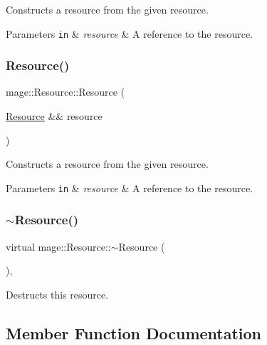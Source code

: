 Constructs a resource from the given resource.


\begin{DoxyParams}[1]{Parameters}
\mbox{\tt in}  & {\em resource} & A reference to the resource. \\
\hline
\end{DoxyParams}
\hypertarget{classmage_1_1_resource_a48b6219dc7c2366d097dd462fb5448b4}{}\label{classmage_1_1_resource_a48b6219dc7c2366d097dd462fb5448b4} 
\subsubsection{\texorpdfstring{Resource()}{Resource()}\hspace{0.1cm}{\footnotesize\ttfamily [3/3]}}
{\footnotesize\ttfamily mage\+::\+Resource\+::\+Resource (\begin{DoxyParamCaption}\item[{\hyperlink{classmage_1_1_resource}{Resource} \&\&}]{resource }\end{DoxyParamCaption})\hspace{0.3cm}{\ttfamily [default]}}

Constructs a resource from the given resource.


\begin{DoxyParams}[1]{Parameters}
\mbox{\tt in}  & {\em resource} & A reference to the resource. \\
\hline
\end{DoxyParams}
\hypertarget{classmage_1_1_resource_a26cea6261aac321d95ac745703f1a3e8}{}\label{classmage_1_1_resource_a26cea6261aac321d95ac745703f1a3e8} 
\subsubsection{\texorpdfstring{$\sim$\+Resource()}{~Resource()}}
{\footnotesize\ttfamily virtual mage\+::\+Resource\+::$\sim$\+Resource (\begin{DoxyParamCaption}{ }\end{DoxyParamCaption})\hspace{0.3cm}{\ttfamily [virtual]}, {\ttfamily [default]}}

Destructs this resource. 

\subsection{Member Function Documentation}
\hypertarget{classmage_1_1_resource_a4e05079ab19ef95e11cefa487690fd25}{}\label{classmage_1_1_resource_a4e05079ab19ef95e11cefa487690fd25} 
